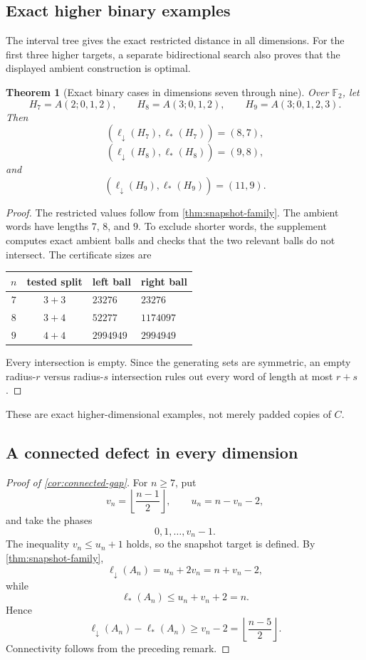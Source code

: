 \documentclass[11pt]{amsart}
\numberwithin{equation}{section}
\newtheorem{theorem}{Theorem}[section]
\theoremstyle{definition}
\theoremstyle{remark}
\newcommand{\F}{\mathbb F}
\newcommand{\ellDown}{\ell_{\downarrow}}
\newcommand{\ellAll}{\ell_{*}}
\begin{document}
\subsection{Exact higher binary examples}

The interval tree gives the exact restricted distance in all dimensions.  For the first three higher targets, a separate bidirectional search also proves that the displayed ambient construction is optimal.

\begin{theorem}[Exact binary cases in dimensions seven through nine]\label{thm:higher-exact}
Over $\F_2$, let
\[
H_7=A(2;0,1,2),
\qquad
H_8=A(3;0,1,2),
\qquad
H_9=A(3;0,1,2,3).
\]
Then
\[
(\ellDown(H_7),\ellAll(H_7))=(8,7),
\]
\[
(\ellDown(H_8),\ellAll(H_8))=(9,8),
\]
and
\[
(\ellDown(H_9),\ellAll(H_9))=(11,9).
\]
\end{theorem}

\begin{proof}
The restricted values follow from \cref{thm:snapshot-family}.  The ambient words have lengths $7$, $8$, and $9$.  To exclude shorter words, the supplement computes exact ambient balls and checks that the two relevant balls do not intersect.  The certificate sizes are
\begin{center}
\begin{tabular}{@{}ccll@{}}
\toprule
$n$&tested split&left ball&right ball\\
\midrule
$7$&$3+3$&$23276$&$23276$\\
$8$&$3+4$&$52277$&$1174097$\\
$9$&$4+4$&$2994949$&$2994949$\\
\bottomrule
\end{tabular}
\end{center}
Every intersection is empty.  Since the generating sets are symmetric, an empty radius-$r$ versus radius-$s$ intersection rules out every word of length at most $r+s$.
\end{proof}

These are exact higher-dimensional examples, not merely padded copies of $C$.

\subsection{A connected defect in every dimension}

\begin{proof}[Proof of \cref{cor:connected-gap}]
For $n\ge7$, put
\[
v_n=\left\lfloor\frac{n-1}{2}\right\rfloor,
\qquad
u_n=n-v_n-2,
\]
and take the phases
\[
0,1,\ldots,v_n-1.
\]
The inequality $v_n\le u_n+1$ holds, so the snapshot target is defined.  By \cref{thm:snapshot-family},
\[
\ellDown(A_n)=u_n+2v_n=n+v_n-2,
\]
while
\[
\ellAll(A_n)\le u_n+v_n+2=n.
\]
Hence
\[
\ellDown(A_n)-\ellAll(A_n)
\ge v_n-2
=
\left\lfloor\frac{n-5}{2}\right\rfloor.
\]
Connectivity follows from the preceding remark.
\end{proof}
\end{document}
